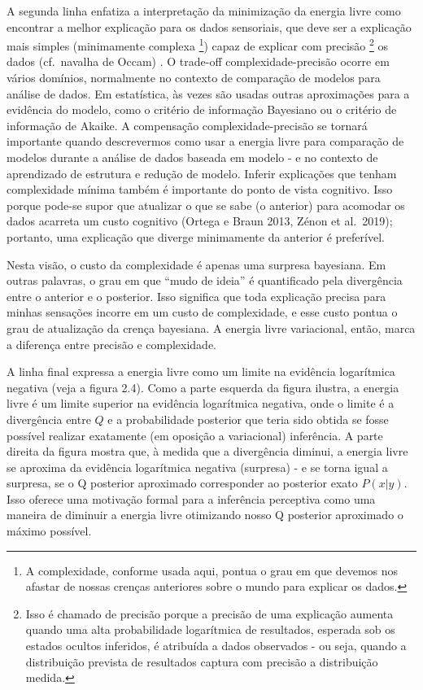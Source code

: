 \documentclass[
  12pt,
]{book}
\begin{document}
A segunda linha enfatiza a interpretação da minimização da energia livre como encontrar a melhor explicação para os dados sensoriais, que deve ser a explicação mais simples (minimamente complexa \footnote{A complexidade, conforme usada aqui, pontua o grau em que devemos nos afastar de nossas crenças anteriores sobre o mundo para explicar os dados.}) capaz de explicar com precisão \footnote{Isso é chamado de precisão porque a precisão de uma explicação aumenta quando uma alta probabilidade logarítmica de resultados, esperada sob os estados ocultos inferidos, é atribuída a dados observados - ou seja, quando a distribuição prevista de resultados captura com precisão a distribuição medida.} os dados (cf.~navalha de Occam) . O trade-off complexidade-precisão ocorre em vários domínios, normalmente no contexto de comparação de modelos para análise de dados. Em estatística, às vezes são usadas outras aproximações para a evidência do modelo, como o critério de informação Bayesiano ou o critério de informação de Akaike. A compensação complexidade-precisão se tornará importante quando descrevermos como usar a energia livre para comparação de modelos durante a análise de dados baseada em modelo - e no contexto de aprendizado de estrutura e redução de modelo. Inferir explicações que tenham complexidade mínima também é importante do ponto de vista cognitivo. Isso porque pode-se supor que atualizar o que se sabe (o anterior) para acomodar os dados acarreta um custo cognitivo (Ortega e Braun 2013, Zénon et al.~2019); portanto, uma explicação que diverge minimamente da anterior é preferível.

Nesta visão, o custo da complexidade é apenas uma surpresa bayesiana. Em outras palavras, o grau em que ``mudo de ideia'' é quantificado pela divergência entre o anterior e o posterior. Isso significa que toda explicação precisa para minhas sensações incorre em um custo de complexidade, e esse custo pontua o grau de atualização da crença bayesiana. A energia livre variacional, então, marca a diferença entre precisão e complexidade.

A linha final expressa a energia livre como um limite na evidência logarítmica negativa (veja a figura 2.4). Como a parte esquerda da figura ilustra, a energia livre é um limite superior na evidência logarítmica negativa, onde o limite é a divergência entre \(Q\) e a probabilidade posterior que teria sido obtida se fosse possível realizar exatamente (em oposição a variacional) inferência. A parte direita da figura mostra que, à medida que a divergência diminui, a energia livre se aproxima da evidência logarítmica negativa (surpresa) - e se torna igual a surpresa, se o Q posterior aproximado corresponder ao posterior exato \(P(x | y)\). Isso oferece uma motivação formal para a inferência perceptiva como uma maneira de diminuir a energia livre otimizando nosso Q posterior aproximado o máximo possível.
\end{document}
